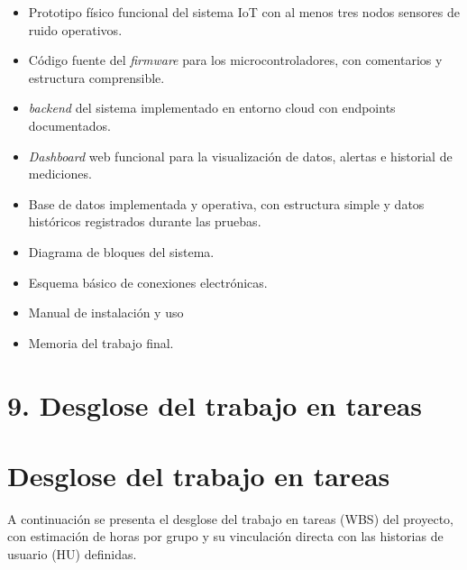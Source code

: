 \documentclass[
11pt, %
]{charter}
\begin{document}
\begin{itemize}
    \item Prototipo físico funcional del sistema IoT con al menos tres nodos sensores de ruido operativos.
    \item Código fuente del \textit{firmware} para los microcontroladores, con comentarios y estructura comprensible.
    \item \textit{backend} del sistema implementado en entorno cloud con endpoints documentados.
    \item \textit{Dashboard} web funcional para la visualización de datos, alertas e historial de mediciones.
    \item Base de datos implementada y operativa, con estructura simple y datos históricos registrados durante las pruebas.
    \item Diagrama de bloques del sistema.
    \item Esquema básico de conexiones electrónicas.
    \item Manual de instalación y uso
    \item Memoria del trabajo final.
    
\end{itemize}



\section{9. Desglose del trabajo en tareas}
\label{sec:wbs}

\section{Desglose del trabajo en tareas}

A continuación se presenta el desglose del trabajo en tareas (WBS) del proyecto, con estimación de horas por grupo y su vinculación directa con las historias de usuario (HU) definidas.
\end{document}
